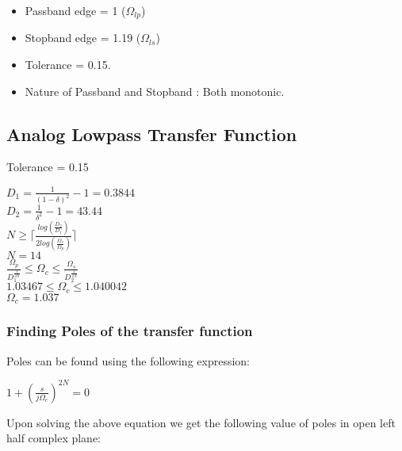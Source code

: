 \documentclass{article}
\begin{document}
\begin{itemize}
    \item Passband edge = 1 ($\Omega_{lp}$)
    \item Stopband edge = 1.19 ($\Omega_{ls}$)
    \item Tolerance = 0.15.
    \item Nature of Passband and Stopband : Both monotonic.
\end{itemize}

\subsection{Analog Lowpass Transfer Function}
 Tolerance = 0.15\\

 \begin{center}
     $D_{1} = \frac{1}{(1-\delta)^2} - 1 = 0.3844$\\
     $D_{2} = \frac{1}{\delta^2} - 1 = 43.44$  \\
     $N \geq \lceil \frac{log(\frac{D_2}{D_1})}{2log(\frac{\Omega_s}{\Omega_p})} \rceil$\\
     $N = 14$\\
     $\frac{\Omega_p}{D_{1}^\frac{1}{2N}} \leq \Omega_c \leq \frac{\Omega_s}{D_{2}^\frac{1}{2N}} $\\
     $1.03467 \leq \Omega_c \leq 1.040042$\\
     $\Omega_c = 1.037$\\
 \end{center}

 \subsubsection{Finding Poles of the transfer function}

 Poles can be found using the following expression:\\

 \begin{center}
     $1 + (\frac{s}{j\Omega_c})^{2N} = 0$\\
 \end{center}

 Upon solving the above equation we get the following value of poles in open left half complex plane:\\
\end{document}
